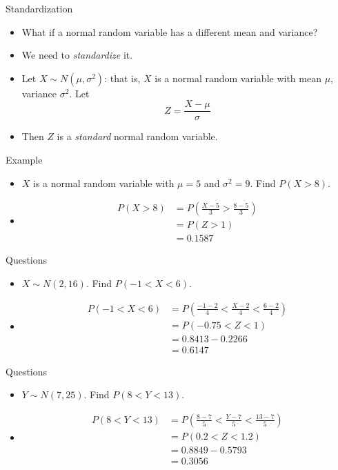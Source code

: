 \documentclass[10pt, xcolor=table]{beamer}
\begin{document}
\begin{frame}{Standardization}
\begin{itemize}
\setlength{\itemsep}{20pt}
\item<1-> What if a normal random variable has a different mean and variance?
\item<2-> We need to \emph{standardize} it. 
\item<3-> Let $X \sim N(\mu, \sigma^2)$: that is, $X$ is a normal random variable with mean $\mu$, variance $\sigma^2$. Let
$$Z = \frac{X - \mu}{\sigma}$$
\item<4-> Then $Z$ is a \emph{standard} normal random variable.
\end{itemize}
\end{frame}

\begin{frame}{Example}
\begin{itemize}
\item<1-> $X$ is a normal random variable with $\mu = 5$ and $\sigma^2 = 9$. Find $P(X > 8)$.
\item<2->[] {\color{red}
\begin{align*}
P(X > 8) &= P\left( \frac{X-5}{3} > \frac{8 - 5}{3}\right)\\
&= P(Z > 1) \\
&= 0.1587
\end{align*}}
\end{itemize}
\end{frame}

\begin{frame}{Questions}
\begin{itemize}
\item<1-> $X \sim N(2, 16)$. Find $P(-1 < X < 6)$.
\item<2->[] \color{red}
\begin{align*}
P(-1 < X < 6 ) &= P\left(\frac{-1-2}{4} < \frac{X - 2}{4} < \frac{6 - 2}{4}\right) \\
&= P(-0.75 < Z < 1) \\
&= 0.8413 - 0.2266 \\
&= 0.6147
\end{align*} 
\end{itemize}
\end{frame}

\begin{frame}{Questions}
\begin{itemize}
\item<1-> $Y \sim N(7, 25)$. Find $P(8 < Y < 13)$.
\item<2->[] \color{red}
\begin{align*}
P(8 < Y < 13 )&= P\left(\frac{8 - 7}{5} < \frac{Y -7}{5}< \frac{13 - 7}{5}\right) \\
&= P(0.2 < Z < 1.2)\\
&= 0.8849 - 0.5793 \\
&= 0.3056
\end{align*}
\end{itemize}
\end{frame}
\end{document}
